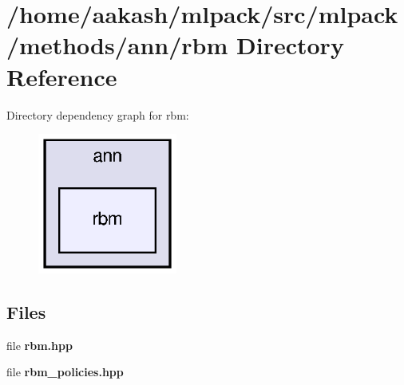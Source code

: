 \section{/home/aakash/mlpack/src/mlpack/methods/ann/rbm Directory Reference}
\label{dir_1416f22f5f714fbb770cd2eba58d71e0}
Directory dependency graph for rbm\+:
\nopagebreak
\begin{figure}[H]
\begin{center}
\leavevmode
\includegraphics[width=130pt]{dir_1416f22f5f714fbb770cd2eba58d71e0_dep}
\end{center}
\end{figure}
\subsection*{Files}
\begin{DoxyCompactItemize}
\item 
file \textbf{ rbm.\+hpp}
\item 
file \textbf{ rbm\+\_\+policies.\+hpp}
\end{DoxyCompactItemize}
